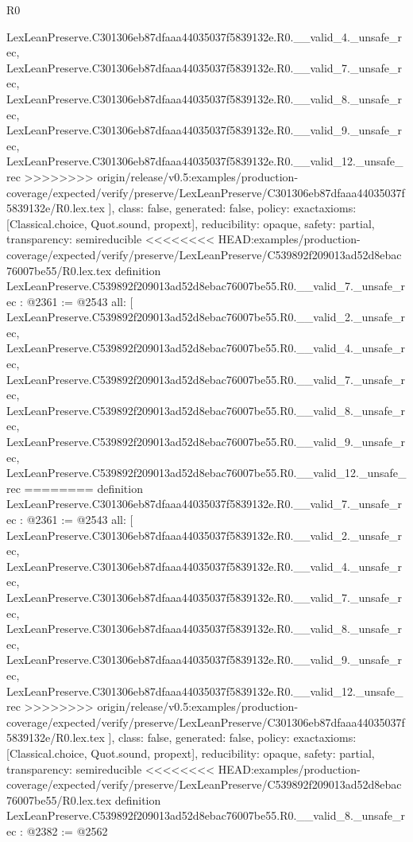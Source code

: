 \begin{lexlean}{R0}
\begin{coremodule}
{{{{{{{{{{{{{{{{{{{{{{{{{{{{{{{{{{{{{{{{{{{{{{{{{{{{    LexLeanPreserve.C301306eb87dfaaa44035037f5839132e.R0.__valid_4._unsafe_rec,
    LexLeanPreserve.C301306eb87dfaaa44035037f5839132e.R0.__valid_7._unsafe_rec,
    LexLeanPreserve.C301306eb87dfaaa44035037f5839132e.R0.__valid_8._unsafe_rec,
    LexLeanPreserve.C301306eb87dfaaa44035037f5839132e.R0.__valid_9._unsafe_rec,
    LexLeanPreserve.C301306eb87dfaaa44035037f5839132e.R0.__valid_12._unsafe_rec
>>>>>>>> origin/release/v0.5:examples/production-coverage/expected/verify/preserve/LexLeanPreserve/C301306eb87dfaaa44035037f5839132e/R0.lex.tex
  ],
  class: false,
  generated: false,
  policy: exact{axioms: [Classical.choice, Quot.sound, propext]},
  reducibility: opaque{},
  safety: partial,
  transparency: semireducible
}
<<<<<<<< HEAD:examples/production-coverage/expected/verify/preserve/LexLeanPreserve/C539892f209013ad52d8ebac76007be55/R0.lex.tex
definition LexLeanPreserve.C539892f209013ad52d8ebac76007be55.R0.__valid_7._unsafe_rec : @2361 := @2543 {
  all: [
    LexLeanPreserve.C539892f209013ad52d8ebac76007be55.R0.__valid_2._unsafe_rec,
    LexLeanPreserve.C539892f209013ad52d8ebac76007be55.R0.__valid_4._unsafe_rec,
    LexLeanPreserve.C539892f209013ad52d8ebac76007be55.R0.__valid_7._unsafe_rec,
    LexLeanPreserve.C539892f209013ad52d8ebac76007be55.R0.__valid_8._unsafe_rec,
    LexLeanPreserve.C539892f209013ad52d8ebac76007be55.R0.__valid_9._unsafe_rec,
    LexLeanPreserve.C539892f209013ad52d8ebac76007be55.R0.__valid_12._unsafe_rec
========
definition LexLeanPreserve.C301306eb87dfaaa44035037f5839132e.R0.__valid_7._unsafe_rec : @2361 := @2543 {
  all: [
    LexLeanPreserve.C301306eb87dfaaa44035037f5839132e.R0.__valid_2._unsafe_rec,
    LexLeanPreserve.C301306eb87dfaaa44035037f5839132e.R0.__valid_4._unsafe_rec,
    LexLeanPreserve.C301306eb87dfaaa44035037f5839132e.R0.__valid_7._unsafe_rec,
    LexLeanPreserve.C301306eb87dfaaa44035037f5839132e.R0.__valid_8._unsafe_rec,
    LexLeanPreserve.C301306eb87dfaaa44035037f5839132e.R0.__valid_9._unsafe_rec,
    LexLeanPreserve.C301306eb87dfaaa44035037f5839132e.R0.__valid_12._unsafe_rec
>>>>>>>> origin/release/v0.5:examples/production-coverage/expected/verify/preserve/LexLeanPreserve/C301306eb87dfaaa44035037f5839132e/R0.lex.tex
  ],
  class: false,
  generated: false,
  policy: exact{axioms: [Classical.choice, Quot.sound, propext]},
  reducibility: opaque{},
  safety: partial,
  transparency: semireducible
}
<<<<<<<< HEAD:examples/production-coverage/expected/verify/preserve/LexLeanPreserve/C539892f209013ad52d8ebac76007be55/R0.lex.tex
definition LexLeanPreserve.C539892f209013ad52d8ebac76007be55.R0.__valid_8._unsafe_rec : @2382 := @2562 {
}}}}}}}}}}}}}}}}}}}}}}}}}}}}}}}}}}}}}}}}}}}}}}}}}}}}}
\end{coremodule}
\end{lexlean}
